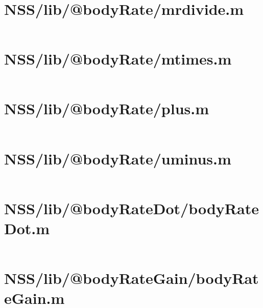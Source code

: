 \section*{NSS/lib/@bodyRate/mrdivide.m}\label{code:NSS/lib/@bodyRate/mrdivide.m}
\inputminted[linenos,fontsize=\scriptsize]{matlab}{/home/dcouture/git/mathyourlife/TSatPy/beta_versions/matlab_object_oriented/lib/@bodyRate/mrdivide.m}

\pagebreak
\section*{NSS/lib/@bodyRate/mtimes.m}\label{code:NSS/lib/@bodyRate/mtimes.m}
\inputminted[linenos,fontsize=\scriptsize]{matlab}{/home/dcouture/git/mathyourlife/TSatPy/beta_versions/matlab_object_oriented/lib/@bodyRate/mtimes.m}

\pagebreak
\section*{NSS/lib/@bodyRate/plus.m}\label{code:NSS/lib/@bodyRate/plus.m}
\inputminted[linenos,fontsize=\scriptsize]{matlab}{/home/dcouture/git/mathyourlife/TSatPy/beta_versions/matlab_object_oriented/lib/@bodyRate/plus.m}

\pagebreak
\section*{NSS/lib/@bodyRate/uminus.m}\label{code:NSS/lib/@bodyRate/uminus.m}
\inputminted[linenos,fontsize=\scriptsize]{matlab}{/home/dcouture/git/mathyourlife/TSatPy/beta_versions/matlab_object_oriented/lib/@bodyRate/uminus.m}

\pagebreak
\section*{NSS/lib/@bodyRateDot/bodyRateDot.m}\label{code:NSS/lib/@bodyRateDot/bodyRateDot.m}
\inputminted[linenos,fontsize=\scriptsize]{matlab}{/home/dcouture/git/mathyourlife/TSatPy/beta_versions/matlab_object_oriented/lib/@bodyRateDot/bodyRateDot.m}

\pagebreak
\section*{NSS/lib/@bodyRateGain/bodyRateGain.m}\label{code:NSS/lib/@bodyRateGain/bodyRateGain.m}
\inputminted[linenos,fontsize=\scriptsize]{matlab}{/home/dcouture/git/mathyourlife/TSatPy/beta_versions/matlab_object_oriented/lib/@bodyRateGain/bodyRateGain.m}

